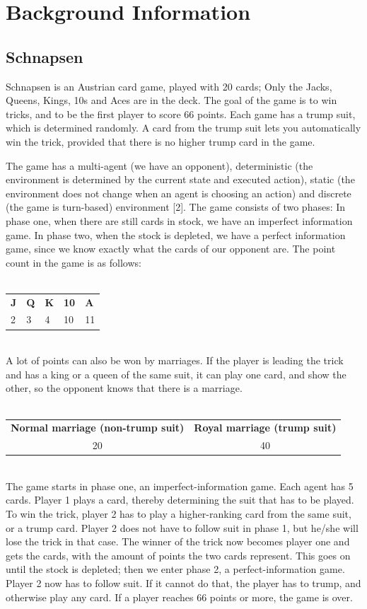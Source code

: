 \documentclass[a4paper,11pt]{article}
\begin{document}
\section{Background Information}
\subsection{Schnapsen}
Schnapsen is an Austrian card game, played with 20 cards; Only the Jacks, Queens, Kings, 10s and Aces are in the deck. The goal of the game is to win tricks, and to be the first player to score 66 points. Each game has a trump suit, which is determined randomly. A card from the trump suit lets you automatically win the trick, provided that there is no higher trump card in the game.

The game has a multi-agent (we have an opponent), deterministic (the environment is determined by the current state and executed action), static (the environment does not change when an agent is choosing an action) and discrete (the game is turn-based) environment [2]. The game consists of two phases: In phase one, when there are still cards in stock, we have an imperfect information game. In phase two, when the stock is depleted, we have a perfect information game, since we know exactly what the cards of our opponent are. The point count in the game is as follows: \\ \\
\noindent
\begin{tabular}{l l l l l}
\textbf{J} & \textbf{Q} & \textbf{K} & \textbf{10} & \textbf{A} \\
2 & 3 & 4 & 10 & 11 \\
\end{tabular} \\

\noindent
A lot of points can also be won by marriages. If the player is leading the trick and has a king or a queen of the same suit, it can play one card, and show the other, so the opponent knows that there is a marriage.\\ \\
\noindent
\begin{tabular} {c c}
\textbf{Normal marriage (non-trump suit)} & \textbf{Royal marriage (trump suit)} \\
20 & 40 \\
\end{tabular}\\

\noindent
The game starts in phase one, an imperfect-information game. Each agent has 5 cards. Player 1 plays a card, thereby determining the suit that has to be played. To win the trick, player 2 has to play a higher-ranking card from the same suit, or a trump card. Player 2 does not have to follow suit in phase 1, but he/she will lose the trick in that case. The winner of the trick now becomes player one and gets the cards, with the amount of points the two cards represent. This goes on until the stock is depleted; then we enter phase 2, a perfect-information game. Player 2 now has to follow suit. If it cannot do that, the player has to trump, and otherwise play any card. If a player reaches 66 points or more, the game is over.
\end{document}
